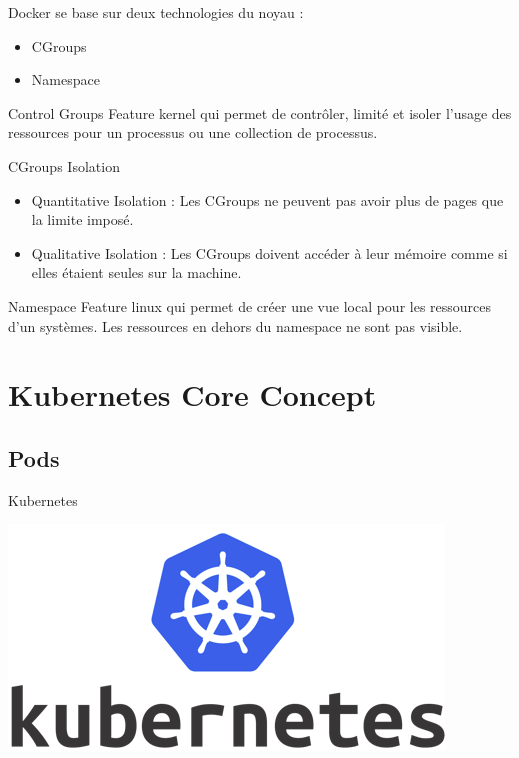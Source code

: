 \documentclass{bredelebeamer}
\begin{document}
\begin{frame}
Docker se base sur deux technologies du noyau : 
\begin{itemize}
\item CGroups
\item Namespace
\end{itemize} \pause

\begin{exampleblock}{Control Groups}
Feature kernel qui permet de contrôler, limité et isoler l'usage des ressources pour un processus ou une collection de processus. 
\end{exampleblock} \pause


\begin{block} {CGroups Isolation}
\begin{itemize}
\item  Quantitative Isolation : Les CGroups ne peuvent pas avoir plus de pages que la limite imposé.
\item Qualitative Isolation : Les CGroups doivent accéder à leur mémoire comme si elles étaient seules sur la machine.
\end{itemize}
\end{block} \pause

\begin{exampleblock}{Namespace}
Feature linux qui permet de créer une vue local pour les ressources d'un systèmes. Les ressources en dehors du namespace ne sont pas visible. 
\end{exampleblock}
\end{frame}


\section{Kubernetes  Core Concept}
\subsection{Pods}

\begin{frame}{Kubernetes}
\begin{center}
\includegraphics[scale=0.3]{images/img6.png}
\end{center}
\end{frame}
\end{document}
